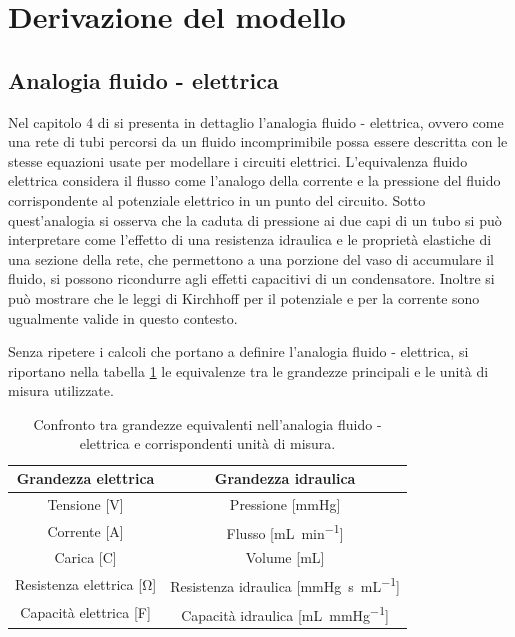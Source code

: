 \documentclass{article}
\begin{document}
\section{Derivazione del modello}
\subsection{Analogia fluido - elettrica}
Nel capitolo 4 di \cite{notes} si presenta in dettaglio l'analogia fluido - elettrica, ovvero come una rete di tubi percorsi da un fluido incomprimibile possa essere descritta con le stesse equazioni usate per modellare i circuiti elettrici.
L'equivalenza fluido elettrica considera il flusso come l'analogo della corrente e la pressione del fluido corrispondente al potenziale elettrico in un punto del circuito.
Sotto quest'analogia si osserva che la caduta di pressione ai due capi di un tubo si può interpretare come l'effetto di una resistenza idraulica e le proprietà elastiche di una sezione della rete, che permettono a una porzione del vaso di accumulare il fluido, si possono ricondurre agli effetti capacitivi di un condensatore.
Inoltre si può mostrare che le leggi di Kirchhoff per il potenziale e per la corrente sono ugualmente valide in questo contesto.

Senza ripetere i calcoli che portano a definire l'analogia fluido - elettrica, si riportano nella tabella \ref{tab_analogia} le equivalenze tra le grandezze principali e le unità di misura utilizzate.

\begin{table}[h!]
\begin{center}
\begin{tabular}{| c | c |}
\hline
\textbf{Grandezza elettrica} & \textbf{Grandezza idraulica}\\
\hline
Tensione [\si{\volt}] & Pressione [\si{\mmHg}]\\
Corrente [\si{\ampere}] & Flusso [\si{\milli\liter \per \minute}]\\
Carica [\si{\coulomb}] & Volume [\si{\milli\liter}]\\
Resistenza elettrica [\si{\ohm}] & Resistenza idraulica [\si{\mmHg \second \per \milli\liter}]\\
Capacità elettrica [\si{\farad}] & Capacità idraulica [\si{\milli\liter \per \mmHg}]\\
\hline
\end{tabular}
\caption{Confronto tra grandezze equivalenti nell'analogia fluido - elettrica e corrispondenti unità di misura.}
\label{tab_analogia}
\end{center}
\end{table}
\end{document}
